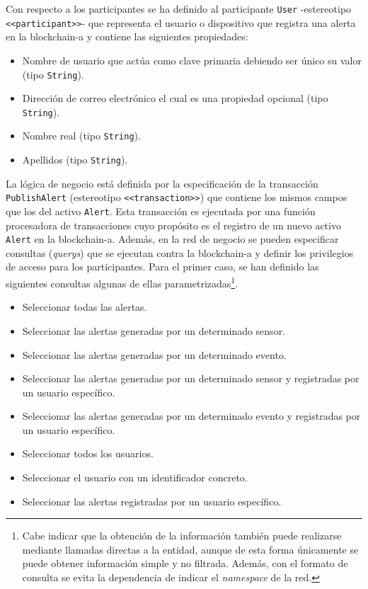 \documentclass[12pt,a4paper, twoside]{report}
\begin{document}
	Con respecto a los participantes se ha definido al participante \texttt{User} -estereotipo \texttt{<<participant>>}- que representa el usuario o dispositivo que registra una alerta en la \gls{blockchain-a} y contiene las siguientes propiedades:
			
		\begin{itemize}
			\item Nombre de usuario que actúa como clave primaria debiendo ser único su valor (tipo \texttt{String}). 
			\item Dirección de correo electrónico el cual es una propiedad opcional (tipo \texttt{String}).
			\item Nombre real (tipo \texttt{String}).
			\item Apellidos (tipo \texttt{String}).
		\end{itemize}
	
	La lógica de negocio está definida por la especificación de la transacción \texttt{PublishAlert} (estereotipo \texttt{<<transaction>>}) que contiene los mismos campos que los del activo \texttt{Alert}. Esta transacción es ejecutada por una función procesadora de transacciones cuyo propósito es el registro de un nuevo activo \texttt{Alert} en la \gls{blockchain-a}. Además, en la red de negocio se pueden especificar consultas (\textit{querys}) que se ejecutan contra la \gls{blockchain-a} y definir los privilegios de acceso para los participantes. Para el primer caso, se han definido las siguientes consultas algunas de ellas parametrizadas\footnote{Cabe indicar que la obtención de la información también puede realizarse mediante llamadas directas a la entidad, aunque de esta forma únicamente se puede obtener información simple y no filtrada. Además, con el formato de consulta se evita la dependencia de indicar el \textit{namespace} de la red.}.
		
	\begin{itemize}
		\item Seleccionar todas las alertas.
		\item Seleccionar las alertas generadas por un determinado sensor.
		\item Seleccionar las alertas generadas por un determinado evento.
		\item Seleccionar las alertas generadas por un determinado sensor y registradas por un usuario específico.
		\item Seleccionar las alertas generadas por un determinado evento y registradas por un usuario específico.
		\item Seleccionar todos los usuarios.
		\item Seleccionar el usuario con un identificador concreto.
		\item Seleccionar las alertas registradas por un usuario específico.
	\end{itemize}
\end{document}
